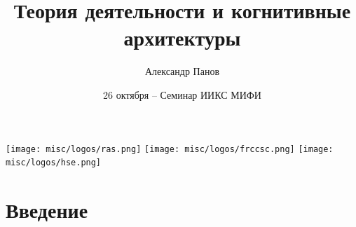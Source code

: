 \documentclass[default]{beamer}
\begin{document}
	
	\title[Обучение в знаковой КМ]{Теория деятельности и когнитивные архитектуры}
	\author[Панов]{Александр Панов}
	\date{26 октября -- Семинар ИИКС МИФИ} 
	
	\begin{frame}
		\titlepage
		\centering
		\texttt{[image: misc/logos/ras.png]} \hspace{10pt}
		\texttt{[image: misc/logos/frccsc.png]} \hspace{10pt}
		\texttt{[image: misc/logos/hse.png]}
	\end{frame}
	
	\begin{frame}
		\small
		\tableofcontents
	\end{frame}

	\section{Введение}
\end{document}
